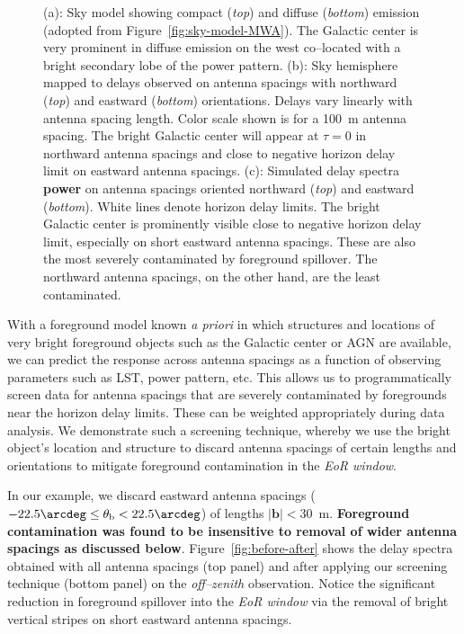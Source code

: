 \documentclass[preprint2,iop,numberedappendix,twocolappendix,appendixfloats]{emulateapj}
\begin{document}
\begin{figure}[htb]
\caption{(a): Sky model showing compact ({\it top}) and diffuse ({\it bottom}) emission (adopted from Figure~\ref{fig:sky-model-MWA}). The Galactic center is very prominent in diffuse emission on the west co--located with a bright secondary lobe of the power pattern. (b): Sky hemisphere mapped to delays observed on antenna spacings with northward ({\it top}) and eastward ({\it bottom}) orientations. Delays vary linearly with antenna spacing length. Color scale shown is for a 100~m antenna spacing. The bright Galactic center will appear at $\tau=0$ in northward antenna spacings and close to negative horizon delay limit on eastward antenna spacings. (c): Simulated delay spectra {\bf power} on antenna spacings oriented northward ({\it top}) and eastward ({\it bottom}). White lines denote horizon delay limits. The bright Galactic center is prominently visible close to negative horizon delay limit, especially on short eastward antenna spacings. These are also the most severely contaminated by foreground spillover. The northward antenna spacings, on the other hand, are the least contaminated.}
\label{fig:breakup}
\end{figure}

With a foreground model known {\it a priori} in which structures and locations of very bright foreground objects such as the Galactic center or AGN are available, we can predict the response across antenna spacings as a function of observing parameters such as LST, power pattern, etc. This allows us to programmatically screen data for antenna spacings that are severely contaminated by foregrounds near the horizon delay limits. These can be weighted appropriately during data analysis. We demonstrate such a screening technique, whereby we use the bright object's location and structure to discard antenna spacings of certain lengths and orientations to mitigate foreground contamination in the {\it EoR window}. 

In our example, we discard eastward antenna spacings ($-22.5\arcdeg\le\theta_\textrm{b}< 22.5\arcdeg$) of lengths $|\boldsymbol{b}| < 30$~m. {\bf Foreground contamination was found to be insensitive to removal of wider antenna spacings as discussed below}. Figure~\ref{fig:before-after} shows the delay spectra obtained with all antenna spacings (top panel) and after applying our screening technique (bottom panel) on the {\it off--zenith} observation. Notice the significant reduction in foreground spillover into the {\it EoR window} via the removal of bright vertical stripes on short eastward antenna spacings. 
\end{document}

